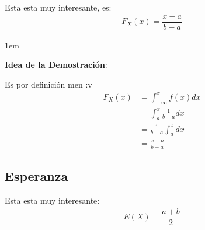 \documentclass[12pt, fleqn]{report}                             %
\newenvironment{SmallIndentation}[1][0.75em]                    %
        {\begin{adjustwidth}{#1}{}\begin{footnotesize}}             %
        {\end{footnotesize}\end{adjustwidth}}                       %
\theoremstyle{break}                                            %
\begin{document}
                Esta esta muy interesante, es:
                \begin{align*}
                    F_X(x) = \dfrac{x - a}{b - a}                  
                \end{align*}

                \begin{SmallIndentation}[1em]
                    \textbf{Idea de la Demostración}:
                    
                    Es por definición men :v
                    \begin{align*}
                        F_X(x)
                            &= \int_{-\infty}^x f(x) dx         \\
                            &= \int_a^x \frac{1}{b-a} dx        \\
                            &= \frac{1}{b-a} \int_a^x dx        \\
                            &= \frac{x - a}{b - a}
                    \end{align*}
                
                \end{SmallIndentation}
                    


            \clearpage
            \subsection{Esperanza}

                Esta esta muy interesante:
                \begin{align*}
                    E(X) = \dfrac{a+b}{2}                    
                \end{align*}
\end{document}
